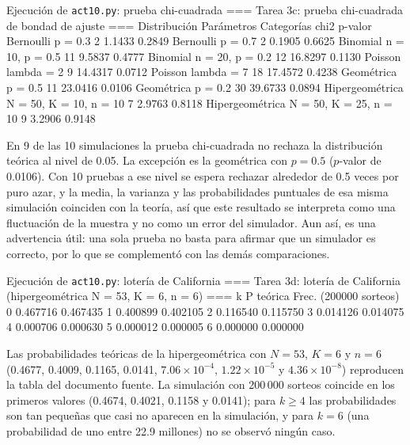 \documentclass[11pt,letterpaper]{article}
\begin{document}
\begin{consola}[label=out:t3c]{Ejecución de \texttt{act10.py}: prueba chi-cuadrada}
=== Tarea 3c: prueba chi-cuadrada de bondad de ajuste ===
   Distribución             Parámetros  Categorías    chi2  p-valor
      Bernoulli                p = 0.3           2  1.1433   0.2849
      Bernoulli                p = 0.7           2  0.1905   0.6625
       Binomial        n = 10, p = 0.5          11  9.5837   0.4777
       Binomial        n = 20, p = 0.2          12 16.8297   0.1130
        Poisson             lambda = 2           9 14.4317   0.0712
        Poisson             lambda = 7          18 17.4572   0.4238
     Geométrica                p = 0.5          11 23.0416   0.0106
     Geométrica                p = 0.2          30 39.6733   0.0894
Hipergeométrica N = 50, K = 10, n = 10           7  2.9763   0.8118
Hipergeométrica N = 50, K = 25, n = 10           9  3.2906   0.9148
\end{consola}

En 9 de las 10 simulaciones la prueba chi-cuadrada no rechaza la distribución teórica al nivel de 0.05. La excepción es la geométrica con $p = 0.5$ ($p$-valor de 0.0106). Con 10 pruebas a ese nivel se espera rechazar alrededor de 0.5 veces por puro azar, y la media, la varianza y las probabilidades puntuales de esa misma simulación coinciden con la teoría, así que este resultado se interpreta como una fluctuación de la muestra y no como un error del simulador. Aun así, es una advertencia útil: una sola prueba no basta para afirmar que un simulador es correcto, por lo que se complementó con las demás comparaciones.

\begin{consola}[label=out:t3d]{Ejecución de \texttt{act10.py}: lotería de California}
=== Tarea 3d: lotería de California (hipergeométrica N = 53, K = 6, n = 6) ===
 k  P teórica  Frec. (200000 sorteos)
 0   0.467716                0.467435
 1   0.400899                0.402105
 2   0.116540                0.115750
 3   0.014126                0.014075
 4   0.000706                0.000630
 5   0.000012                0.000005
 6   0.000000                0.000000
\end{consola}

Las probabilidades teóricas de la hipergeométrica con $N = 53$, $K = 6$ y $n = 6$ (0.4677, 0.4009, 0.1165, 0.0141, $7.06 \times 10^{-4}$, $1.22 \times 10^{-5}$ y $4.36 \times 10^{-8}$) reproducen la tabla del documento fuente. La simulación con 200\,000 sorteos coincide en los primeros valores (0.4674, 0.4021, 0.1158 y 0.0141); para $k \ge 4$ las probabilidades son tan pequeñas que casi no aparecen en la simulación, y para $k = 6$ (una probabilidad de uno entre 22.9 millones) no se observó ningún caso.
\end{document}
